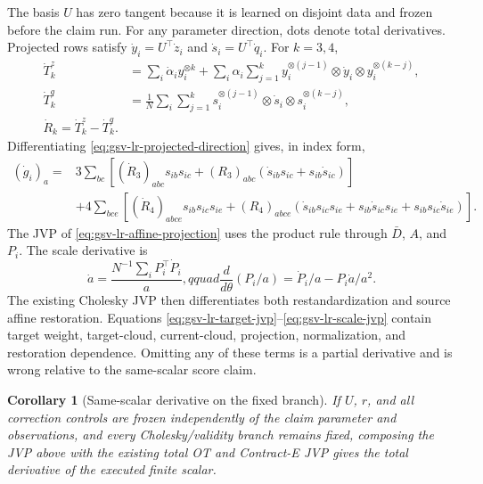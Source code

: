 \documentclass[11pt]{article}
\newtheorem{corollary}[proposition]{Corollary}
\theoremstyle{definition}
\theoremstyle{remark}
\begin{document}
The basis $U$ has zero tangent because it is learned on disjoint data and
frozen before the claim run.  For any parameter direction, dots denote total
derivatives.  Projected rows satisfy
$\dot y_i=U^\top\dot z_i$ and $\dot s_i=U^\top\dot q_i$.  For $k=3,4$,
\begin{align}
 \dot T_k^z
 &=\sum_i\dot\alpha_i y_i^{\otimes k}
 +\sum_i\alpha_i\sum_{j=1}^k
 y_i^{\otimes(j-1)}\otimes\dot y_i\otimes
 y_i^{\otimes(k-j)},
 \label{eq:gsv-lr-target-jvp}\\
 \dot T_k^q
 &=\frac1N\sum_i\sum_{j=1}^k
 s_i^{\otimes(j-1)}\otimes\dot s_i\otimes
 s_i^{\otimes(k-j)},
 \\
 \dot R_k=\dot T_k^z-\dot T_k^q .
 \label{eq:gsv-lr-current-jvp}
\end{align}
Differentiating \eqref{eq:gsv-lr-projected-direction} gives, in index form,
\begin{align}
 (\dot g_i)_a={}&3\sum_{bc}
 \left[(\dot R_3)_{abc}s_{ib}s_{ic}
 +(R_3)_{abc}(\dot s_{ib}s_{ic}+s_{ib}\dot s_{ic})\right] \\
 &+4\sum_{bce}\left[(\dot R_4)_{abce}s_{ib}s_{ic}s_{ie}
 +(R_4)_{abce}(\dot s_{ib}s_{ic}s_{ie}
 +s_{ib}\dot s_{ic}s_{ie}+s_{ib}s_{ic}\dot s_{ie})\right].
 \label{eq:gsv-lr-direction-jvp}
\end{align}
The JVP of \eqref{eq:gsv-lr-affine-projection} uses the product rule through
$\bar D$, $A$, and $P_i$.  The scale derivative is
\begin{equation}
 \dot a=\frac{N^{-1}\sum_iP_i^\top\dot P_i}{a},qquad
 \frac{d}{d\theta}(P_i/a)=\dot P_i/a-P_i\dot a/a^2.
 \label{eq:gsv-lr-scale-jvp}
\end{equation}
The existing Cholesky JVP then differentiates both restandardization and
source affine restoration.  Equations
\eqref{eq:gsv-lr-target-jvp}--\eqref{eq:gsv-lr-scale-jvp} contain target
weight, target-cloud, current-cloud, projection, normalization, and
restoration dependence.  Omitting any of these terms is a partial derivative
and is wrong relative to the same-scalar score claim.

\begin{corollary}[Same-scalar derivative on the fixed branch]
\label{cor:gsv-lr-same-scalar}
If $U$, $r$, and all correction controls are frozen independently of the
claim parameter and observations, and every Cholesky/validity branch remains
fixed, composing the JVP above with the existing total OT and Contract-E JVP
gives the total derivative of the executed finite scalar.
\end{corollary}
\end{document}
